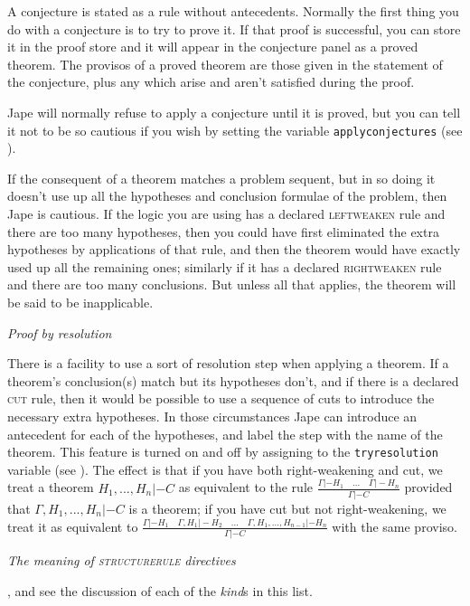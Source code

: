 A conjecture is stated as a rule without antecedents. Normally the first thing you do with a conjecture is to try to prove it. If that proof is successful, you can store it in the proof store and it will appear in the conjecture panel as a proved theorem. The provisos of a proved theorem are those given in the statement of the conjecture, plus any which arise and aren't satisfied during the proof.


Jape will normally refuse to apply a conjecture until it is proved, but you can tell it not to be so cautious if you wish by setting the variable \texttt{applyconjectures} (see ).


If the consequent of a theorem matches a problem sequent, but in so doing it doesn't use up all the hypotheses and conclusion formulae of the problem, then Jape is cautious. If the logic you are using has a declared \textsc{leftweaken} rule and there are too many hypotheses, then you could have first eliminated the extra hypotheses by applications of that rule, and then the theorem would have exactly used up all the remaining ones; similarly if it has a declared \textsc{rightweaken} rule and there are too many conclusions. But unless all that applies, the theorem will be said to be inapplicable.


\textit{Proof by resolution}


There is a facility to use a sort of resolution step when applying a theorem. If a theorem's conclusion(s) match but its hypotheses don't, and if there is a declared \textsc{cut} rule, then it would be possible to use a sequence of cuts to introduce the necessary extra hypotheses. In those circumstances Jape can introduce an antecedent for each of the hypotheses, and label the step with the name of the theorem. This feature is turned on and off by assigning to the \texttt{tryresolution} variable (see ). The effect is that if you have both right-weakening and cut, we treat a theorem $H_{1},...,H_{n}  |- C$ as equivalent to the rule $\frac{\Gamma  |- H_{1} \quad ...\quad \Gamma  |- H_{n} }{\Gamma  |- C} $ provided that $\Gamma,H_{1},...,H_{n}  |- C$ is a theorem; if you have cut but not right-weakening, we treat it as equivalent to $\frac{\Gamma  |- H_{1} \quad \Gamma,H_{1}  |- H_{2} \quad ...\quad \Gamma,H_{1},...,H_{n-1}  |- H_{n} }{\Gamma  |- C} $ with the same proviso.


\textit{The meaning of \textsc{structurerule} directives}

, and see the discussion of each of the \textit{kind}s in this list.

